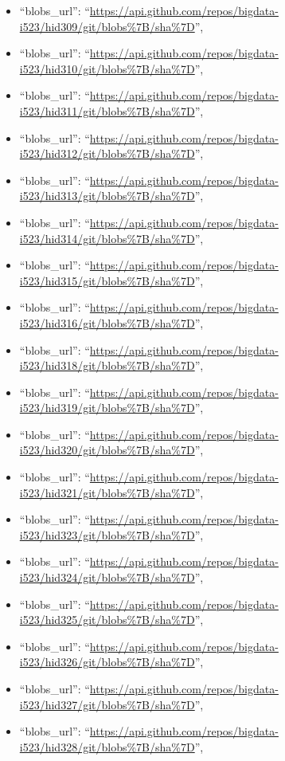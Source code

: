 \begin{itemize}
\item
  ``blobs\_url'':
  ``\url{https://api.github.com/repos/bigdata-i523/hid309/git/blobs\%7B/sha\%7D}'',
\item
  ``blobs\_url'':
  ``\url{https://api.github.com/repos/bigdata-i523/hid310/git/blobs\%7B/sha\%7D}'',
\item
  ``blobs\_url'':
  ``\url{https://api.github.com/repos/bigdata-i523/hid311/git/blobs\%7B/sha\%7D}'',
\item
  ``blobs\_url'':
  ``\url{https://api.github.com/repos/bigdata-i523/hid312/git/blobs\%7B/sha\%7D}'',
\item
  ``blobs\_url'':
  ``\url{https://api.github.com/repos/bigdata-i523/hid313/git/blobs\%7B/sha\%7D}'',
\item
  ``blobs\_url'':
  ``\url{https://api.github.com/repos/bigdata-i523/hid314/git/blobs\%7B/sha\%7D}'',
\item
  ``blobs\_url'':
  ``\url{https://api.github.com/repos/bigdata-i523/hid315/git/blobs\%7B/sha\%7D}'',
\item
  ``blobs\_url'':
  ``\url{https://api.github.com/repos/bigdata-i523/hid316/git/blobs\%7B/sha\%7D}'',
\item
  ``blobs\_url'':
  ``\url{https://api.github.com/repos/bigdata-i523/hid318/git/blobs\%7B/sha\%7D}'',
\item
  ``blobs\_url'':
  ``\url{https://api.github.com/repos/bigdata-i523/hid319/git/blobs\%7B/sha\%7D}'',
\item
  ``blobs\_url'':
  ``\url{https://api.github.com/repos/bigdata-i523/hid320/git/blobs\%7B/sha\%7D}'',
\item
  ``blobs\_url'':
  ``\url{https://api.github.com/repos/bigdata-i523/hid321/git/blobs\%7B/sha\%7D}'',
\item
  ``blobs\_url'':
  ``\url{https://api.github.com/repos/bigdata-i523/hid323/git/blobs\%7B/sha\%7D}'',
\item
  ``blobs\_url'':
  ``\url{https://api.github.com/repos/bigdata-i523/hid324/git/blobs\%7B/sha\%7D}'',
\item
  ``blobs\_url'':
  ``\url{https://api.github.com/repos/bigdata-i523/hid325/git/blobs\%7B/sha\%7D}'',
\item
  ``blobs\_url'':
  ``\url{https://api.github.com/repos/bigdata-i523/hid326/git/blobs\%7B/sha\%7D}'',
\item
  ``blobs\_url'':
  ``\url{https://api.github.com/repos/bigdata-i523/hid327/git/blobs\%7B/sha\%7D}'',
\item
  ``blobs\_url'':
  ``\url{https://api.github.com/repos/bigdata-i523/hid328/git/blobs\%7B/sha\%7D}'',

\end{itemize}
